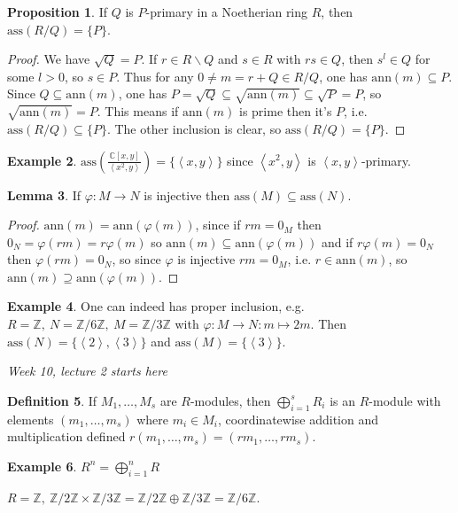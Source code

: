 \documentclass[a4paper]{article}
\newcommand{\la}{\left\langle}
\newcommand{\ra}{\right\rangle}
\newcommand{\Z}{\mathbb Z}
\newcommand{\C}{\mathbb C}
\newcommand{\ass}{\text{ass}}
\newcommand{\ann}{\text{ann}}
\theoremstyle{definition}
\newtheorem{defn}{Definition}[subsection]
\newtheorem{prop}[defn]{Proposition}
\newtheorem{lemma}[defn]{Lemma}
\newtheorem{example}[defn]{Example}
\begin{document}
\begin{prop}
\label{prop:assRQ=P}
If $Q$ is $P$-primary in a Noetherian ring $R$, then $\ass(R/Q)=\{P\}$.
\end{prop}
\begin{proof}
We have $\sqrt Q=P$. If $r\in R\backslash Q$ and $s\in R$ with $rs\in Q$, then $s^l\in Q$ for some $l>0$, so $s\in P$. Thus for any $0\neq m=r+Q\in R/Q$, one has $\ann(m)\subseteq P$. Since $Q\subseteq\ann(m)$, one has $P=\sqrt Q\subseteq \sqrt{\ann(m)}\subseteq \sqrt P=P$, so $\sqrt{\ann(m)}=P$. This means if $\ann(m)$ is prime then it's $P$, i.e. $\ass(R/Q)\subseteq\{P\}$. The other inclusion is clear, so $\ass(R/Q)=\{P\}$.
\end{proof}

\begin{example}
$\displaystyle \ass\left(\frac{\C[x,y]}{\la x^2,y\ra}\right)=\{\la x,y\ra\}$ since $\la x^2,y\ra$ is $\la x,y\ra$-primary.
\end{example}

\begin{lemma}
\label{lemma:injthenasssubset}
If $\varphi:M\rightarrow N$ is injective then $\ass(M)\subseteq\ass(N)$.
\end{lemma}
\begin{proof}
$\ann(m)=\ann(\varphi(m))$, since if $rm=0_M$ then $0_N=\varphi(rm)=r\varphi(m)$ so $\ann(m)\subseteq \ann(\varphi(m))$ and if $r\varphi(m)=0_N$ then $\varphi(rm)=0_N$, so since $\varphi$ is injective $rm=0_M$, i.e. $r\in\ann(m)$, so $\ann(m)\supseteq \ann(\varphi(m))$.
\end{proof}
\begin{example}
One can indeed has proper inclusion, e.g. $R=\Z,\ N=\Z/6\Z,\ M=\Z/3\Z$ with $\varphi:M\rightarrow N:m\mapsto 2m$. Then $\ass(N)=\{\la 2\ra, \la 3\ra\}$ and $\ass(M)=\{\la 3\ra\}$.
\end{example}

\begin{flushright}
\textit{Week 10, lecture 2 starts here}
\end{flushright}

\begin{defn}
If $M_1,\ldots,M_s$ are $R$-modules, then $\bigoplus_{i=1}^s R_i$ is an $R$-module with elements $(m_1,\ldots,m_s)$ where $m_i\in M_i$, coordinatewise addition and multiplication defined $r(m_1,\ldots,m_s)=(rm_1,\ldots,rm_s)$.
\end{defn}
\begin{example}
$R^n=\bigoplus_{i=1}^n R$

$R=\Z,\ \Z/2\Z \times \Z/3\Z=\Z/2\Z \oplus \Z/3\Z=\Z/6\Z$.
\end{example}
\end{document}
